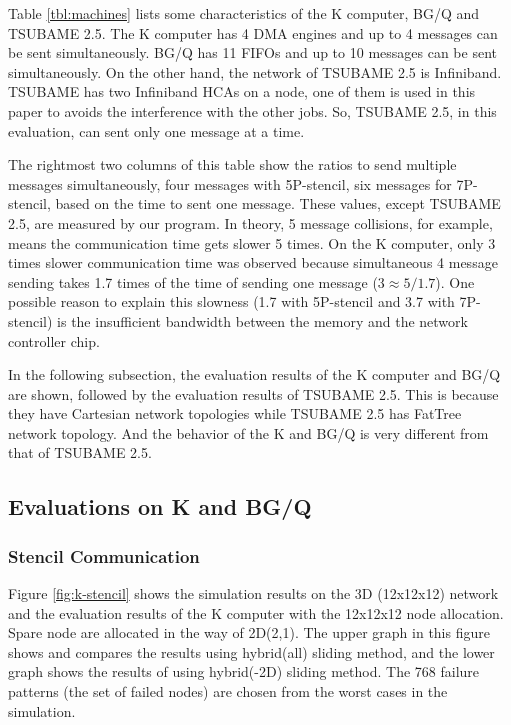 \documentclass[Afour,times,sageh]{sagej}
\begin{document}
Table \ref{tbl:machines} lists some characteristics of the K computer,
BG/Q and TSUBAME 2.5. The K computer has 4 DMA engines and up to 4
messages can be sent simultaneously. BG/Q has 11 FIFOs and up to 10
messages can be sent simultaneously. On the other hand, the network of
TSUBAME 2.5 is Infiniband\citep{infiniband}. TSUBAME has two
Infiniband HCAs on a node, one of them is used in this paper to avoids
the interference with the other jobs. So, TSUBAME 2.5, in this
evaluation, can sent only one message at a time.

The rightmost two columns of this table show the ratios to send
multiple messages simultaneously, four messages with 5P-stencil, six
messages for 7P-stencil, based on the time to sent one message. These
values, except TSUBAME 2.5, are measured by our program. In
theory, 5 message collisions, for example, means the communication
time gets slower 5 times. On the K computer, only 3 times
slower communication time was observed because simultaneous 4 message
sending takes 1.7 times of the time of sending one message ($3 \approx
5/1.7$)\citep{Hori-EuroMPI2015}. One possible reason to explain this
slowness (1.7 with 5P-stencil and 3.7 with 7P-stencil) is the
insufficient bandwidth between the memory and the network controller
chip.

In the following subsection, the evaluation results of the K computer
and BG/Q are shown, followed by the evaluation results of TSUBAME
2.5. This is because they have Cartesian network topologies
while TSUBAME 2.5 has FatTree network topology. And the behavior of
the K and BG/Q is very different from that of TSUBAME 2.5.

\subsection{Evaluations on K and BG/Q}

\subsubsection{Stencil Communication}

Figure \ref{fig:k-stencil} shows the simulation results on the
3D (12x12x12) network and the evaluation results of the K computer with
the 12x12x12 node allocation. Spare node are allocated in the way of
2D(2,1). The upper graph in this figure shows and compares the
results using hybrid(all) sliding method, and the lower graph shows
the results of using hybrid(-2D) sliding method. The 768 failure
patterns (the set of failed nodes) are chosen from the worst cases in
the simulation.
\end{document}

